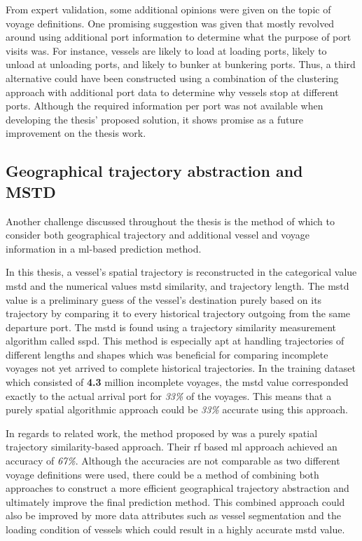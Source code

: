 From expert validation, some additional opinions were given on the topic of voyage definitions. One promising suggestion was given that mostly revolved around using additional port information to determine what the purpose of port visits was. For instance, vessels are likely to load at loading ports, likely to unload at unloading ports, and likely to bunker at bunkering ports. Thus, a third alternative could have been constructed using a combination of the clustering approach with additional port data to determine why vessels stop at different ports. Although the required information per port was not available when developing the thesis' proposed solution, it shows promise as a future improvement on the thesis work.

\subsection{Geographical trajectory abstraction and MSTD}

Another challenge discussed throughout the thesis is the method of which to consider both geographical trajectory and additional vessel and voyage information in a \acrfull{ml}-based prediction method.

In this thesis, a vessel's spatial trajectory is reconstructed in the categorical value \acrfull{mstd} and the numerical values \acrshort{mstd} similarity, and trajectory length. The \acrshort{mstd} value is a preliminary guess of the vessel's destination purely based on its trajectory by comparing it to every historical trajectory outgoing from the same departure port. The \acrshort{mstd} is found using a trajectory similarity measurement algorithm called \acrfull{sspd}. This method is especially apt at handling trajectories of different lengths and shapes which was beneficial for comparing incomplete voyages not yet arrived to complete historical trajectories. In the training dataset which consisted of \textbf{4.3} million incomplete voyages, the \acrshort{mstd} value corresponded exactly to the actual arrival port for \textit{33\%} of the voyages. This means that a purely spatial algorithmic approach could be \textit{33\%} accurate using this approach.

In regards to related work, the method proposed by \cite{Zhang2020AISApproach} was a purely spatial trajectory similarity-based approach. Their \acrfull{rf} based \acrshort{ml} approach achieved an accuracy of \textit{67\%}. Although the accuracies are not comparable as two different voyage definitions were used, there could be a method of combining both approaches to construct a more efficient geographical trajectory abstraction and ultimately improve the final prediction method. This combined approach could also be improved by more data attributes such as vessel segmentation and the loading condition of vessels which could result in a highly accurate \acrshort{mstd} value.

